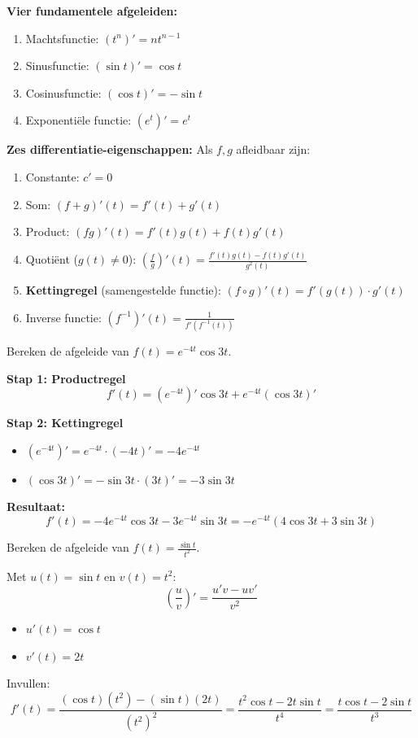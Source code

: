 \begin{theorie}
\textbf{Vier fundamentele afgeleiden:}
\begin{enumerate}
    \item Machtsfunctie: $(t^n)' = n t^{n-1}$
    \item Sinusfunctie: $(\sin t)' = \cos t$
    \item Cosinusfunctie: $(\cos t)' = -\sin t$
    \item Exponentiële functie: $(e^t)' = e^t$
\end{enumerate}

\textbf{Zes differentiatie-eigenschappen:}
Als $f, g$ afleidbaar zijn:
\begin{enumerate}
    \item Constante: $c' = 0$
    \item Som: $(f + g)'(t) = f'(t) + g'(t)$
    \item Product: $(f g)'(t) = f'(t)g(t) + f(t)g'(t)$
    \item Quotiënt ($g(t) \neq 0$): $\displaystyle \left(\frac{f}{g}\right)'(t) = \frac{f'(t)g(t) - f(t)g'(t)}{g^2(t)}$
    \item \textbf{Kettingregel} (samengestelde functie): $(f \circ g)'(t) = f'(g(t)) \cdot g'(t)$
    \item Inverse functie: $(f^{-1})'(t) = \frac{1}{f'(f^{-1}(t))}$
\end{enumerate}
\end{theorie}

\begin{voorbeeld}
Bereken de afgeleide van $f(t) = e^{-4t} \cos 3t$.

\textbf{Stap 1: Productregel}
\[ f'(t) = (e^{-4t})' \cos 3t + e^{-4t} (\cos 3t)' \]

\textbf{Stap 2: Kettingregel}
\begin{itemize}
    \item $(e^{-4t})' = e^{-4t} \cdot (-4t)' = -4e^{-4t}$
    \item $(\cos 3t)' = -\sin 3t \cdot (3t)' = -3\sin 3t$
\end{itemize}

\textbf{Resultaat:}
\[ \boxed{f'(t) = -4e^{-4t} \cos 3t - 3e^{-4t} \sin 3t = -e^{-4t}(4\cos 3t + 3\sin 3t)} \]
\end{voorbeeld}

\begin{voorbeeld}[Quotiëntregel]
Bereken de afgeleide van $f(t) = \frac{\sin t}{t^2}$.

Met $u(t) = \sin t$ en $v(t) = t^2$:
\[ \left(\frac{u}{v}\right)' = \frac{u'v - uv'}{v^2} \]
\begin{itemize}
    \item $u'(t) = \cos t$
    \item $v'(t) = 2t$
\end{itemize}
Invullen:
\[ \boxed{f'(t) = \frac{(\cos t)(t^2) - (\sin t)(2t)}{(t^2)^2} = \frac{t^2 \cos t - 2t \sin t}{t^4} = \frac{t \cos t - 2 \sin t}{t^3}} \]
\end{voorbeeld}

